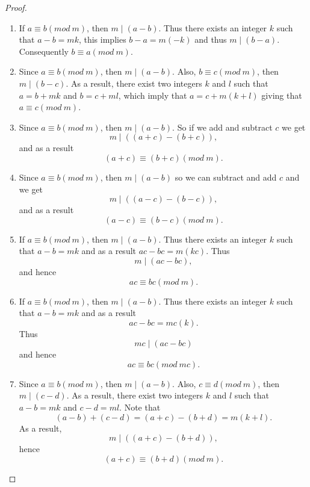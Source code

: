 \documentclass[12pt,letterpaper]{book}
\begin{document}
\begin{proof}
~
\begin{enumerate}
\item{If $a \equiv b(mod \ m)$, then $m\mid (a-b)$. Thus there
exists an integer $k$ such that $a-b=mk$, this implies $b-a=m(-k)$ and
thus $m\mid (b-a)$.  Consequently $b\equiv a (mod \ m)$.}

\item{Since $a\equiv b(mod \ m)$, then $m\mid (a-b)$. Also,
$b\equiv c(mod \ m)$, then $m\mid (b-c)$.  As a result, there exist
two integers $k$ and $l$ such that $a=b+mk$ and $b=c+ml$, which imply that $a=c+m(k+l)$ giving that $a\equiv c (mod \ m)$.}

\item{Since $a\equiv b (mod \ m)$, then $m \mid (a-b)$. So if we
add and subtract $c$ we get
\begin{equation*}
m\mid ((a+c)-(b+c)),
\end{equation*}
and as a result
\begin{equation*}
(a+c)\equiv (b+c) (mod \ m). \end{equation*}}
\item{Since $a\equiv b (mod \ m)$, then $m \mid (a-b)$ so we can
subtract and add $c$ and we get
\begin{equation*}
m\mid ((a-c)-(b-c)),
\end{equation*}
and as a result
\begin{equation*}
(a-c)\equiv (b-c) (mod \ m). \end{equation*}}
\item{If $a \equiv b(mod \ m)$, then $m\mid (a-b)$. Thus there
exists an integer $k$ such that $a-b=mk$ and as a result $ac-bc=m(kc)$.
Thus
\begin{equation*}
m\mid (ac-bc),
\end{equation*}
and hence
\begin{equation*}
ac\equiv bc (mod \ m). \end{equation*}}
\item{If $a \equiv b(mod \
m)$, then $m\mid (a-b)$. Thus there exists an integer $k$ such that
$a-b=mk$ and as a result
\begin{equation*}
ac-bc=mc(k).
\end{equation*}
Thus
\begin{equation*}
mc\mid (ac-bc)
\end{equation*}
and hence
\begin{equation*}
ac\equiv bc (mod \ mc). \end{equation*}}
\item{Since $a\equiv b(mod \ m)$, then $m\mid (a-b)$. Also, $c\equiv
d(mod \ m)$, then $m\mid (c-d)$. As a result, there exist two
integers $k$ and $l$ such that $a-b=mk$ and $c-d=ml$. Note that
\begin{equation*}
(a-b)+(c-d)=(a+c)-(b+d)=m(k+l).
\end{equation*}
As a result,
\begin{equation*}
m\mid ((a+c)-(b+d)),
\end{equation*}
hence
\begin{equation*}
(a+c)\equiv (b+d)(mod \ m).\end{equation*}}


\end{enumerate}
\end{proof}
\end{document}
